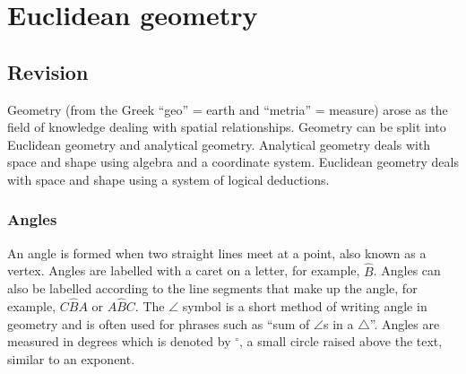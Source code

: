 \chapter{Euclidean geometry}
\setcounter{figure}{1}
\setcounter{subfigure}{1}
\section {Revision}
\setcounter{figure}{1}
\setcounter{subfigure}{1}

Geometry (from the Greek ``geo'' = earth and ``metria'' = measure) arose as the field of knowledge
dealing with spatial relationships. Geometry can be split into Euclidean geometry and analytical geometry. 
Analytical geometry deals with space and shape using algebra and a coordinate system. 
Euclidean geometry deals with space and shape using a system of logical deductions.\par 
{}
\subsection*{Angles}
An angle is formed when two straight lines meet at a point, also known as a vertex. 
Angles are labelled with a caret on a letter, for example, $\hat{B}$.
Angles can also be labelled according to the line segments that make up the
angle, for example, $C\hat{B}A$ or $A\hat{B}C$. 
The $\angle $ symbol is a short method of writing angle in
geometry and is often used for phrases such as ``sum of $\angle$s in a $\triangle$''.
Angles are measured in degrees which is denoted by $^{\circ }$, a small circle
raised above the text, similar to an exponent.\par 


